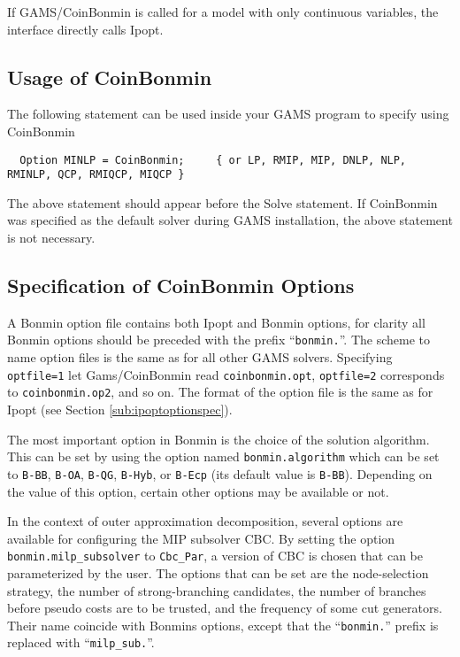 If GAMS/CoinBonmin is called for a model with only continuous variables, the interface directly calls Ipopt.

\subsection{Usage of CoinBonmin}

The following statement can be used inside your GAMS program to specify using CoinBonmin
\begin{verbatim}
  Option MINLP = CoinBonmin;     { or LP, RMIP, MIP, DNLP, NLP, RMINLP, QCP, RMIQCP, MIQCP }
\end{verbatim}

The above statement should appear before the Solve statement.
If CoinBonmin was specified as the default solver during GAMS installation, the above statement is not necessary.

\subsection{Specification of CoinBonmin Options}
\label{sub:bonminoptionspec}

A Bonmin option file contains both Ipopt and Bonmin options, for clarity all Bonmin options should be preceded with the prefix ``\texttt{bonmin.}''.
The scheme to name option files is the same as for all other GAMS solvers.
Specifying \texttt{optfile=1} let Gams/CoinBonmin read \texttt{coinbonmin.opt}, \texttt{optfile=2} corresponds to \texttt{coinbonmin.op2}, and so on.
The format of the option file is the same as for Ipopt (see Section \ref{sub:ipoptoptionspec}).

The most important option in Bonmin is the choice of the solution algorithm.
This can be set by using the option named \texttt{bonmin.algorithm} which can be set to \texttt{B-BB}, \texttt{B-OA}, \texttt{B-QG}, \texttt{B-Hyb}, or \texttt{B-Ecp} (its default value is \texttt{B-BB}).
Depending on the value of this option, certain other options may be available or not.

In the context of outer approximation decomposition, several options are available for configuring the MIP subsolver CBC.
By setting the option \texttt{bonmin.milp\_subsolver} to \texttt{Cbc\_Par}, a version of CBC is chosen that can be parameterized by the user.
The options that can be set are the node-selection strategy, the number of strong-branching candidates, the number of branches before pseudo costs are to be trusted, and the frequency of some cut generators.
Their name coincide with Bonmins options, except that the ``\texttt{bonmin.}'' prefix is replaced with  ``\texttt{milp\_sub.}''.

